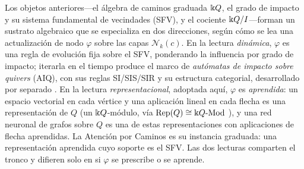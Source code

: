 Los objetos anteriores---el álgebra de caminos graduada $\Bbbk Q$, el grado de impacto
y su sistema fundamental de vecindades (SFV), y el cociente $\Bbbk Q/I$---forman un
sustrato algebraico que se especializa en dos direcciones, según cómo se lea una
actualización de nodo $\varphi$ sobre las capas $\mathcal{N}_k(c)$. En la lectura
\emph{dinámica}, $\varphi$ es una regla de evolución fija sobre el SFV, ponderando
la influencia por grado de impacto; iterarla en el tiempo produce el marco de
\emph{autómatas de impacto sobre quivers} (AIQ), con sus reglas SI/SIS/SIR y su
estructura categorial, desarrollado por separado
\cite{zainea2026aiq,ibanez2025casimulations}. En la lectura
\emph{representacional}, adoptada aquí, $\varphi$ es \emph{aprendida}: un espacio
vectorial en cada vértice y una aplicación lineal en cada flecha es una
representación de $Q$ (un $\Bbbk Q$-módulo, vía
$\mathrm{Rep}(Q)\cong\Bbbk Q\text{-}\mathrm{Mod}$
\cite{schiffler2014quiver,assem2006elements}), y una red neuronal de grafos sobre
$Q$ es una de estas representaciones con aplicaciones de flecha aprendidas. La
Atención por Caminos es su instancia graduada: una representación aprendida cuyo
soporte es el SFV. Las dos lecturas comparten el tronco y difieren solo en si
$\varphi$ se prescribe o se aprende.
